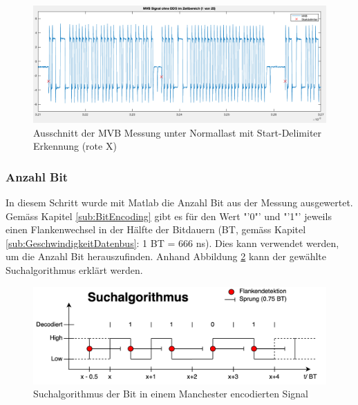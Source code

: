 \begin{figure}[H]
    \centering
    \includegraphics[width=0.8\linewidth]{Figures/Chap3/Busauslastung/Ausschnitt_MVB_mit_Delimiter.png}
    \caption{Ausschnitt der MVB Messung unter Normallast mit
Start-Delimiter Erkennung (rote X)}
    \label{fig:enter-label}
\end{figure}


\subsubsection{Anzahl Bit}
\label{subsub:Nulldurchgänge}
In diesem Schritt wurde mit Matlab die Anzahl Bit aus der Messung ausgewertet. Gemäss Kapitel \ref{sub:BitEncoding} gibt es für den Wert "'0"' und "'1"' jeweils einen Flankenwechsel in der Hälfte der Bitdauern (BT, gemäss Kapitel \ref{sub:GeschwindigkeitDatenbus}: 1 BT = 666 ns). Dies kann verwendet werden, um die Anzahl Bit herauszufinden. Anhand Abbildung \ref{fig:Suchalgo_Bits} kann der gewählte Suchalgorithmus erklärt werden.

\begin{figure}[H]
    \centering
    \includegraphics[width=0.9\linewidth]{Figures/Chap3/Busauslastung/Suchalgorithmus_Bits.png}
    \caption{Suchalgorithmus der Bit in einem Manchester encodierten Signal}
    \label{fig:Suchalgo_Bits}
\end{figure}

